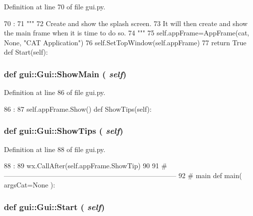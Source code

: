 Definition at line 70 of file gui.py.


\begin{DoxyCode}
70                               :
71         """
72         Create and show the splash screen.
73         It will then create and show the main frame when it is time to do so.
74         """
75         self.appFrame=AppFrame(cat, None, "CAT Application")
76         self.SetTopWindow(self.appFrame)
77         return True
    def Start(self):
\end{DoxyCode}
\hypertarget{classgui_1_1Gui_aa27add666d31a15ac8a5a2937e0bec70}{
\subsubsection[{ShowMain}]{\setlength{\rightskip}{0pt plus 5cm}def gui::Gui::ShowMain ( {\em self})}}
\label{classgui_1_1Gui_aa27add666d31a15ac8a5a2937e0bec70}


Definition at line 86 of file gui.py.


\begin{DoxyCode}
86                       :
87         self.appFrame.Show()
    def ShowTips(self):
\end{DoxyCode}
\hypertarget{classgui_1_1Gui_a530fc2229d33c71374c9c40217bcdda8}{
\subsubsection[{ShowTips}]{\setlength{\rightskip}{0pt plus 5cm}def gui::Gui::ShowTips ( {\em self})}}
\label{classgui_1_1Gui_a530fc2229d33c71374c9c40217bcdda8}


Definition at line 88 of file gui.py.


\begin{DoxyCode}
88                       :
89         wx.CallAfter(self.appFrame.ShowTip)
90 
91 #---------------------------------------------------------------------------
92 # main
def main( argsCat=None ):
\end{DoxyCode}
\hypertarget{classgui_1_1Gui_ae75ecf31b32e2df9c23baf87cf4a7c10}{
\subsubsection[{Start}]{\setlength{\rightskip}{0pt plus 5cm}def gui::Gui::Start ( {\em self})}}
\label{classgui_1_1Gui_ae75ecf31b32e2df9c23baf87cf4a7c10}


